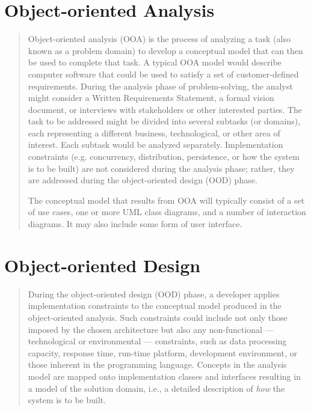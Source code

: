 \documentclass [11pt]{book}
\begin{document}
\section{Object-oriented Analysis}

\label{sec:object-orientedanalysis}



\begin{quote}


Object-oriented analysis (OOA) is the process of analyzing
       a task (also known as a problem domain) to develop a conceptual
       model that can then be used to complete that task. A typical OOA
       model would describe computer software that could be used to
       satisfy a set of customer-defined requirements. During the
       analysis phase of problem-solving, the analyst might consider a
       Written Requirements Statement, a formal vision document, or
       interviews with stakeholders or other interested parties. The
       task to be addressed might be divided into several subtasks (or
       domains), each representing a different business,
       technological, or other area of interest. Each subtask would be
       analyzed separately. Implementation
       constraints (e.g. concurrency, distribution, persistence, or
       how the system is to be built) are not considered during the
       analysis phase; rather, they are addressed during
       the object-oriented design (OOD) phase.



The conceptual model that results from OOA will typically consist of a
set of use cases, one or more UML class diagrams, and a number of
interaction diagrams. It may also include some form of user interface.



\end{quote}


\section{Object-oriented Design}

\label{sec:object-orienteddesign}



\begin{quote}
During the object-oriented design (OOD) phase, a developer
applies implementation constraints to the conceptual model produced in
the object-oriented analysis. Such constraints could include not only
those imposed by the chosen architecture but also any non-functional
--- technological or environmental --- constraints, such as data
processing capacity, response time, run-time platform, development
environment, or those inherent in the programming language. Concepts
in the analysis model are mapped onto implementation classes and
interfaces resulting in a model of the solution domain, i.e., a
detailed description of \emph{how} the system is to be built.

\end{quote}
\end{document}
